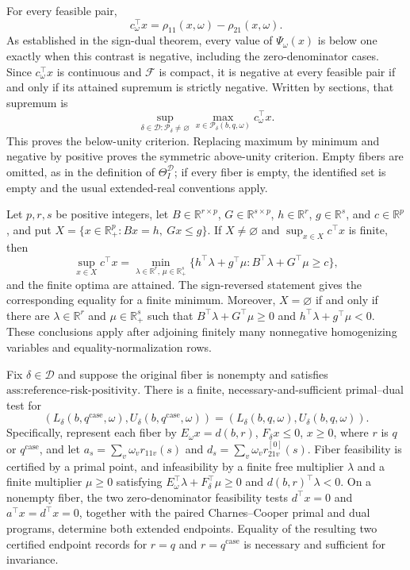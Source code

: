 For every feasible pair,
\[
c_\omega^\top x=\rho_{11}(x,\omega)-\rho_{21}(x,\omega).
\]
As established in the sign-dual theorem, every value of \(\Psi_\omega(x)\) is below one exactly when this contrast is negative, including the zero-denominator cases.  Since \(c_\omega^\top x\) is continuous and \(\mathcal F\) is compact, it is negative at every feasible pair if and only if its attained supremum is strictly negative.  Written by sections, that supremum is
\[
\sup_{\delta\in\mathcal D:\mathcal P_\delta\ne\varnothing}
\max_{x\in\mathcal P_\delta(b,q,\omega)}c_\omega^\top x.
\]
This proves the below-unity criterion.  Replacing maximum by minimum and negative by positive proves the symmetric above-unity criterion.  Empty fibers are omitted, as in the definition of \(\Theta_I^{\mathcal D}\); if every fiber is empty, the identified set is empty and the usual extended-real conventions apply.

Let \(p,r,s\) be positive integers, let \(B\in\mathbb R^{r\times p}\), \(G\in\mathbb R^{s\times p}\), \(h\in\mathbb R^r\), \(g\in\mathbb R^s\), and \(c\in\mathbb R^p\), and put \(X=\{x\in\mathbb R_+^p:Bx=h,\ Gx\leq g\}\).  If \(X\ne\varnothing\) and \(\sup_{x\in X}c^\top x\) is finite, then
\[
\sup_{x\in X}c^\top x
=\min_{\lambda\in\mathbb R^r,\,\mu\in\mathbb R_+^s}
\{h^\top\lambda+g^\top\mu:B^\top\lambda+G^\top\mu\geq c\},
\]
and the finite optima are attained.  The sign-reversed statement gives the corresponding equality for a finite minimum.  Moreover, \(X=\varnothing\) if and only if there are \(\lambda\in\mathbb R^r\) and \(\mu\in\mathbb R_+^s\) such that \(B^\top\lambda+G^\top\mu\geq0\) and \(h^\top\lambda+g^\top\mu<0\).  These conclusions apply after adjoining finitely many nonnegative homogenizing variables and equality-normalization rows.

Fix \(\delta\in\mathcal D\) and suppose the original fiber is nonempty and satisfies \(\text{ass:reference-risk-positivity}\).  There is a finite, necessary-and-sufficient primal--dual test for
\[
(L_\delta(b,q^{\mathrm{case}},\omega),U_\delta(b,q^{\mathrm{case}},\omega))
=(L_\delta(b,q,\omega),U_\delta(b,q,\omega)).
\]
Specifically, represent each fiber by \(E_\omega x=d(b,r)\), \(F_\delta x\leq0\), \(x\geq0\), where \(r\) is \(q\) or \(q^{\mathrm{case}}\), and let \(a_s=\sum_v\omega_vr_{11v}(s)\) and \(d_s=\sum_v\omega_vr^{[0]}_{21v}(s)\).  Fiber feasibility is certified by a primal point, and infeasibility by a finite free multiplier \(\lambda\) and a finite multiplier \(\mu\geq0\) satisfying \(E_\omega^\top\lambda+F_\delta^\top\mu\geq0\) and \(d(b,r)^\top\lambda<0\).  On a nonempty fiber, the two zero-denominator feasibility tests \(d^\top x=0\) and \(a^\top x=d^\top x=0\), together with the paired Charnes--Cooper primal and dual programs, determine both extended endpoints.  Equality of the resulting two certified endpoint records for \(r=q\) and \(r=q^{\mathrm{case}}\) is necessary and sufficient for invariance.

